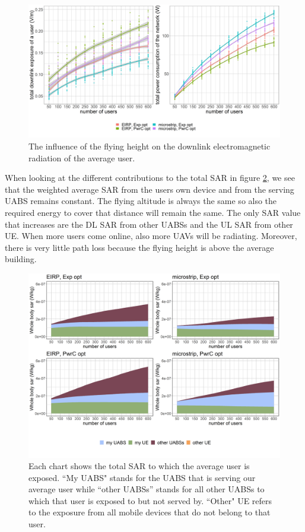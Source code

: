 \begin{figure}[h!]
  \includegraphics[width=\textwidth]{../results/s3/uvsdlAndPc.png}
  \caption{The influence of the flying height on the downlink electromagnetic radiation of the average user.}
  \label{fig:s3b_dlAndPC}
\end{figure}

When looking at the different contributions to the total \gls{SAR} in figure \ref{fig:s3b_fourSourcesMatrix}, 
we see that the weighted average 
\gls{SAR} from the users own device and from the serving \gls{UABS} remains constant. The flying altitude is always the same so 
also the required energy to cover that distance will remain the same. 
The only \gls{SAR} value that increases are the \gls{DL} \gls{SAR} from other \gls{UABS}s and the \gls{UL} \gls{SAR} from other \gls{UE}. 
When more users come online, also more \gls{UAV}s will be radiating. Moreover, there is very little path loss because the flying height is above the average building.

\begin{figure}[h!]
  \includegraphics[width=\textwidth]{../results/s3/uFourSources.png}
  \caption{Each chart shows the total SAR to which the average user is exposed. ``My UABS" stands for the UABS that is serving our average user while ``other UABSs'' stands for 
  all other UABSs to which that user is exposed to but not served by. ``Other" UE refers to the exposure from all mobile devices that do not belong to that user.}
  \label{fig:s3b_fourSourcesMatrix}
\end{figure}